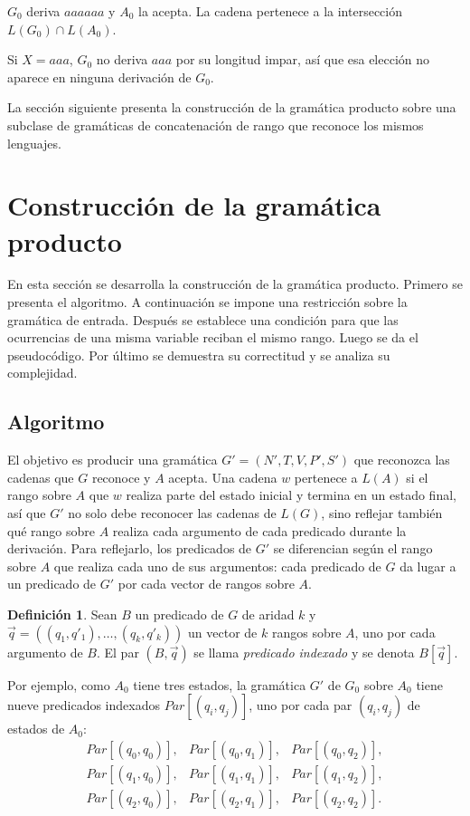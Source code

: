 \documentclass{report}
\theoremstyle{definition}
\newtheorem{definicion}{Definición}[chapter]
\theoremstyle{plain}
\theoremstyle{remark}
\begin{document}
$G_0$ deriva $aaaaaa$ y $A_0$ la acepta. La cadena pertenece a la
intersección $L(G_0) \cap L(A_0)$.

Si $X = aaa$, $G_0$ no deriva $aaa$ por su longitud impar, así que esa
elección no aparece en ninguna derivación de $G_0$.

La sección siguiente presenta la construcción de la gramática producto
sobre una subclase de gramáticas de concatenación de rango que
reconoce los mismos lenguajes.

\section{Construcción de la gramática producto}

En esta sección se desarrolla la construcción de la gramática
producto. Primero se presenta el algoritmo. A continuación se impone
una restricción sobre la gramática de entrada. Después se establece
una condición para que las ocurrencias de una misma variable reciban
el mismo rango. Luego se da el pseudocódigo. Por último se demuestra
su correctitud y se analiza su complejidad.

\subsection{Algoritmo}\label{subsec:algoritmo}

El objetivo es producir una gramática $G' = (N', T, V, P', S')$ que
reconozca las cadenas que $G$ reconoce y $A$ acepta. Una cadena $w$
pertenece a $L(A)$ si el
rango sobre $A$ que $w$ realiza parte del estado inicial y termina en
un estado final, así que $G'$ no solo debe reconocer las cadenas de
$L(G)$, sino reflejar también qué rango sobre $A$ realiza cada
argumento de cada predicado durante la derivación. Para reflejarlo,
los predicados de $G'$ se diferencian según el rango sobre $A$ que
realiza cada uno de sus argumentos: cada predicado de $G$ da lugar a
un predicado de $G'$ por cada vector de rangos sobre $A$.

\begin{definicion}
Sean $B$ un predicado de $G$ de aridad $k$ y
$\vec q = ((q_1, q'_1), \ldots, (q_k, q'_k))$ un vector de $k$ rangos
sobre $A$, uno por cada argumento de $B$. El par $(B, \vec q)$ se
llama \emph{predicado indexado} y se denota $B[\vec q]$.
\end{definicion}

Por ejemplo, como $A_0$ tiene tres estados, la gramática $G'$ de
$G_0$ sobre $A_0$ tiene nueve predicados indexados $Par[(q_i, q_j)]$,
uno por cada par $(q_i, q_j)$ de estados de $A_0$:
\[
  \begin{array}{ccc}
    Par[(q_0, q_0)], & Par[(q_0, q_1)], & Par[(q_0, q_2)], \\
    Par[(q_1, q_0)], & Par[(q_1, q_1)], & Par[(q_1, q_2)], \\
    Par[(q_2, q_0)], & Par[(q_2, q_1)], & Par[(q_2, q_2)].
  \end{array}
\]
\end{document}
